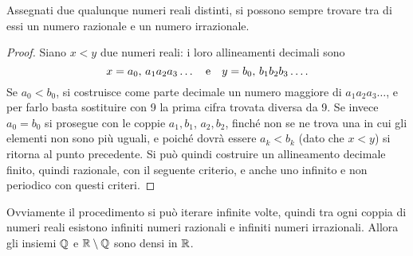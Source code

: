 \begin{teorema}[densità di $\R$]
Assegnati due qualunque numeri reali distinti, si possono sempre trovare tra di essi un numero razionale e un numero irrazionale.
\end{teorema}
\begin{proof}
Siano $x<y$ due numeri reali: i loro allineamenti decimali sono
\[
x=a_0,\,a_1a_2a_3\dots\quad\text{e}\quad y=b_0,\,b_1b_2b_3\dots.
\]
Se $a_0<b_0$, si costruisce come parte decimale un numero maggiore di $a_1a_2a_3\dots$, e per farlo basta sostituire con 9 la prima cifra trovata diversa da 9.
Se invece $a_0=b_0$ si prosegue con le coppie $a_1,b_1$, $a_2,b_2$, finché non se ne trova una in cui gli elementi non sono più uguali, e poiché dovrà essere $a_k<b_k$ (dato che $x<y$) si ritorna al punto precedente.
Si può quindi costruire un allineamento decimale finito, quindi razionale, con il seguente criterio, e anche uno infinito e non periodico con questi criteri.
\end{proof}
Ovviamente il procedimento si può iterare infinite volte, quindi tra ogni coppia di numeri reali esistono infiniti numeri razionali e infiniti numeri irrazionali. Allora gli insiemi $\mathbb{Q}$ e $\mathbb{R}\setminus\mathbb{Q}$ sono densi in $\R$.

